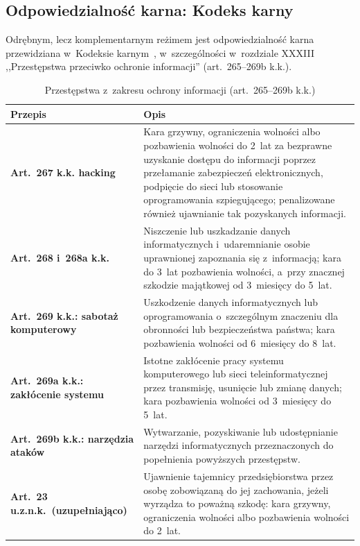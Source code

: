 \subsection{Odpowiedzialność karna: Kodeks karny}

Odrębnym, lecz komplementarnym reżimem jest odpowiedzialność karna przewidziana w~Kodeksie karnym~\autocite{kk1997}, w~szczególności w~rozdziale XXXIII
,,Przestępstwa przeciwko ochronie informacji'' (art.~265--269b k.k.).

\begin{table}[H]
\centering
\caption{Przestępstwa z~zakresu ochrony informacji (art.~265--269b k.k.)}
\label{tab:kk_przestepstwa}
\begin{tabular}{>{\bfseries}p{3.5cm} p{10cm}}
\hline
Przepis & Opis \\
\hline
Art.~267 k.k.\: hacking
  & Kara grzywny, ograniczenia wolności albo pozbawienia wolności do 2~lat
    za bezprawne uzyskanie dostępu do informacji poprzez przełamanie
    zabezpieczeń elektronicznych, podpięcie do sieci lub stosowanie
    oprogramowania szpiegującego; penalizowane również ujawnianie
    tak pozyskanych informacji. \\[4pt]
Art.~268 i~268a k.k. & Niszczenie lub uszkadzanie danych informatycznych i~udaremnianie osobie
    uprawnionej zapoznania się z~informacją; kara do 3~lat pozbawienia
    wolności, a~przy znacznej szkodzie majątkowej od 3~miesięcy do 5~lat. \\[4pt]
Art.~269 k.k.: sabotaż komputerowy
  & Uszkodzenie danych informatycznych lub oprogramowania o~szczególnym
    znaczeniu dla obronności lub bezpieczeństwa państwa;
    kara pozbawienia wolności od 6~miesięcy do 8~lat. \\[4pt]
Art.~269a k.k.: zakłócenie systemu
  & Istotne zakłócenie pracy systemu komputerowego lub sieci
    teleinformatycznej przez transmisję, usunięcie lub zmianę danych;
    kara pozbawienia wolności od 3~miesięcy do 5~lat. \\[4pt]
Art.~269b k.k.: narzędzia ataków
  & Wytwarzanie, pozyskiwanie lub udostępnianie narzędzi informatycznych
    przeznaczonych do popełnienia powyższych przestępstw. \\[4pt]
Art.~23 u.z.n.k.\ (uzupełniająco)
  & Ujawnienie tajemnicy przedsiębiorstwa przez osobę zobowiązaną do jej
    zachowania, jeżeli wyrządza to poważną szkodę: kara grzywny, ograniczenia
    wolności albo pozbawienia wolności do 2~lat. \\
\hline
\end{tabular}
\end{table}

